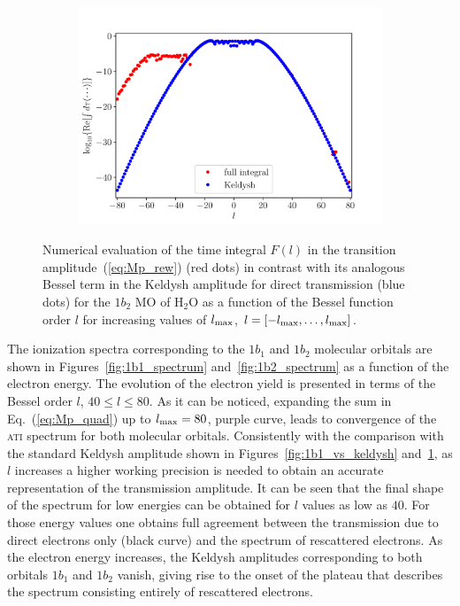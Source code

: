 \begin{figure}
\begin{subfigure}[b]{0.33\linewidth}
    \includegraphics[width=\textwidth]{figures/ch_ATI_SFA/1b2/l80n512WP50PG25MR35vsKeldysh.pdf}
  \end{subfigure}
  \caption{Numerical evaluation of the time integral $F(l)$ in the
    transition amplitude~(\ref{eq:Mp_rew}) (red dots) in contrast with
    its analogous Bessel term in the Keldysh amplitude for direct
    transmission (blue dots) for the $1b_{2}$ MO of H$_{2}$O as a
    function of the Bessel function order $l$ for increasing values of
    $l_{\rm{max}}$, $l=[ -l_{\rm{max}} , \dots, l_{\rm{max}}]$.}
    \label{fig:1b2_vs_keldysh}
\end{figure}

The ionization spectra corresponding to the $1b_{1}$ and $1b_{2}$
molecular orbitals are shown in Figures~\ref{fig:1b1_spectrum}
and~\ref{fig:1b2_spectrum} as a function of the electron energy. The
evolution of the electron yield is presented in terms of the Bessel
order $l$, $40 \leq l \leq 80$. As it can be noticed, expanding the
sum in Eq.~(\ref{eq:Mp_quad}) up to $l_{\rm{max}} = 80$, purple curve,
leads to convergence of the \textsc{ati} spectrum for both molecular
orbitals. Consistently with the comparison with the standard Keldysh
amplitude shown in Figures~\ref{fig:1b1_vs_keldysh}
and~\ref{fig:1b2_vs_keldysh}, as $l$ increases a higher working
precision is needed to obtain an accurate representation of the
transmission amplitude. It can be seen that the final shape of the
spectrum for low energies can be obtained for $l$ values as low as
$40$. For those energy values one obtains full agreement between the
transmission due to direct electrons only (black curve) and the
spectrum of rescattered electrons. As the electron energy increases,
the Keldysh amplitudes corresponding to both orbitals $1b_{1}$ and
$1b_{2}$ vanish, giving rise to the onset of the plateau that
describes the spectrum consisting entirely of rescattered electrons.


